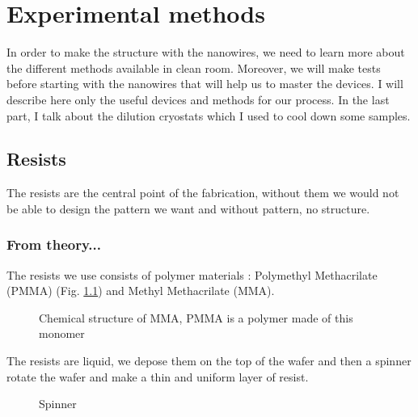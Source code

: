 \chapter{Experimental methods}
\label{Chap2}

    In order to make the structure with the nanowires, we need to learn more about the different methods available in clean room. Moreover, we will make tests before starting with the nanowires that will help us to master the devices. I will describe here only the useful devices and methods for our process. In the last part, I talk about the dilution cryostats which I used to cool down some samples.
    
    \section{Resists}
        
        The resists are the central point of the fabrication, without them we would not be able to design the pattern we want and without pattern, no structure.
        
        \subsection{From theory...}
        
            The resists we use consists of polymer materials : Polymethyl Methacrilate (PMMA) (Fig. \ref{PMMA}) and Methyl Methacrilate (MMA).
            
            \begin{figure}[H]
            \centering
            \caption{Chemical structure of MMA, PMMA is a polymer made of this monomer}
            \label{PMMA}
            \end{figure}
            
            The resists are liquid, we depose them on the top of the wafer and then a spinner rotate the wafer and make a thin and uniform layer of resist.
            
            \begin{figure}[H]
                \centering
                \caption{Spinner}
            \end{figure}
            
